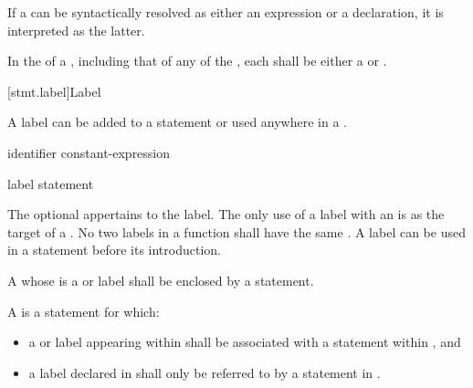\pnum
If a  can be syntactically resolved
as either an expression or a declaration,
it is interpreted as the latter.

\pnum
In the  of a ,
including that of any  of
the ,
each
 shall be either a 
or .

[stmt.label]{Label}%

\pnum
{}%
%
A label can be added to a statement or
used anywhere in a .

\begin{bnf}
\br
     identifier \terminal{:}\br
      constant-expression \terminal{:}\br
      \terminal{:}
\end{bnf}

\begin{bnf}
\br
    label statement
\end{bnf}

The optional  appertains to the label.
%
The only use of a label with an  is
as the target of a .
%
No two labels in a function shall have the same .
A label can be used in a  statement
before its introduction.

\pnum
{}%
%
%
A 
whose  is a  or  label
shall be enclosed by a  statement.

\pnum
A  is a statement  for which:
\begin{itemize}
\item
  a  or  label appearing within  shall
  be associated with a  statement within
  , and
\item
  a label declared in  shall only be referred to by a
  statement in .
\end{itemize}


